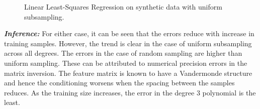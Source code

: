 \documentclass[12pt, a4 paper]{article}
\begin{document}
\begin{figure}
\centering
{}
\caption{Linear Least-Squares Regression on synthetic data with uniform subsampling.}
\label{fig:regression_uniform}
\end{figure}

{\it \bfseries Inference:} For either case, it can be seen that the errors reduce with increase in training samples. However, the trend is clear in the case of uniform subsampling across all degrees. The errors in the case of random sampling are higher than uniform sampling. These can be attributed to numerical precision errors in the matrix inversion. The feature matrix is known to have a Vandermonde structure and hence the conditioning worsens when the spacing between the samples reduces. As the training size increases, the error in the degree $3$ polynomial is the least. \\
\end{document}
